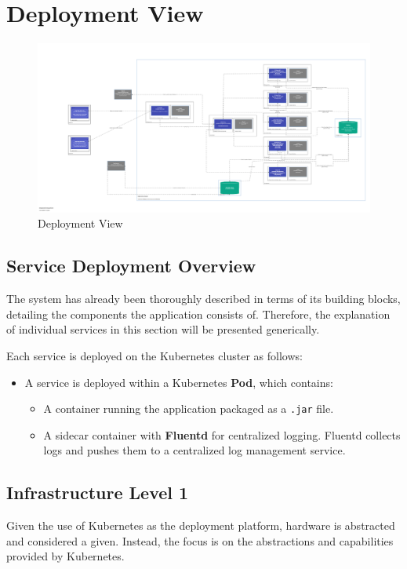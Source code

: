 \hypertarget{section-deployment-view}{%
\section{Deployment View}\label{section-deployment-view}}


\begin{figure}
\centering
    \includegraphics[width=1\linewidth, angle=90]{Deployment.png} %
    \caption{Deployment View}
    \label{fig:deployment-view}
\end{figure}

\subsection{Service Deployment Overview}
The system has already been thoroughly described in terms of its building blocks, detailing the components the application consists of. Therefore, the explanation of individual services in this section will be presented generically.

Each service is deployed on the Kubernetes cluster as follows:
\begin{itemize}
    \item A service is deployed within a Kubernetes \textbf{Pod}, which contains:
    \begin{itemize}
        \item A container running the application packaged as a \texttt{.jar} file.
        \item A sidecar container with \textbf{Fluentd} for centralized logging. Fluentd collects logs and pushes them to a centralized log management service.
    \end{itemize}
\end{itemize}

\hypertarget{_infrastructure_level_1}{%
\subsection{Infrastructure Level 1}\label{_infrastructure_level_1}}
Given the use of Kubernetes as the deployment platform, hardware is abstracted and considered a given. Instead, the focus is on the abstractions and capabilities provided by Kubernetes.

